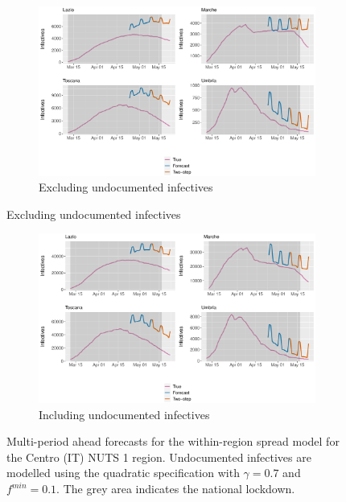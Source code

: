 \documentclass[12pt]{article}
\begin{document}
\begin{appendices}
        \begin{figure}[H]
    	    \centering
    	    \begin{subfigure}{\textwidth}
    	      \centering
    	      \includegraphics[width=0.94\linewidth]{output/model_within_lag14_forecast_full_Centro (IT).pdf}
    	      \caption{Excluding undocumented infectives}
    	      \label{fig:forecast_full_within_centro_regular}
    	    \end{subfigure}
        \end{figure}
        \begin{figure}[H]\ContinuedFloat
    	    \begin{subfigure}{\textwidth}
    	      \centering
    	      \includegraphics[width=0.94\linewidth]{output/model_within_lag14_forecast_full_Centro (IT)_UndocQuadratic.pdf}
    	      \caption{Including undocumented infectives}
    	      \label{fig:forecast_full_within_centro_undoc}
    	    \end{subfigure}
    	    \caption{Multi-period ahead forecasts for the within-region spread model for the Centro (IT) NUTS 1 region. Undocumented infectives are modelled using the quadratic specification with $\gamma = 0.7$ and $f^{min}=0.1$. The grey area indicates the national lockdown.}
    	    \label{fig:forecast_full_within_centro}
        \end{figure}
        

\end{appendices}
\end{document}

